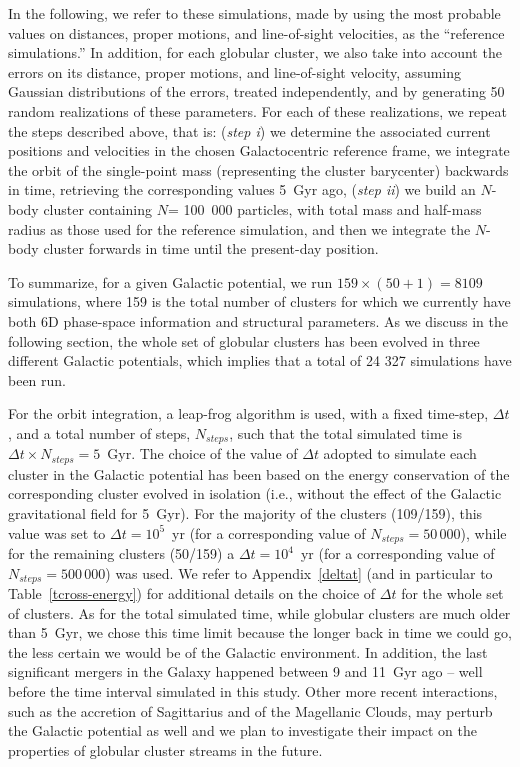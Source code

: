         In the following, we refer to these simulations, made by using the most probable values on distances, proper motions, and line-of-sight velocities, as the ``reference simulations.'' In addition, for each globular cluster, we also take into account the errors on its distance, proper motions, and line-of-sight velocity,  assuming Gaussian distributions of the errors, treated independently, and by generating 50 random realizations of these parameters.  For each of these realizations, we repeat the steps  described above, that is: (\textit{step i}) we determine the associated current positions and velocities in the chosen Galactocentric reference frame, we integrate the orbit of the single-point mass (representing the cluster barycenter) backwards in time, retrieving the corresponding values 5~Gyr ago, (\textit{step ii}) we build an $N$-body cluster containing $N$= 100~000 particles, with total mass and half-mass radius as those used for the reference simulation, and then we integrate the $N$-body cluster forwards in time until the present-day position. 

        To summarize, for a given Galactic potential, we run $159\times (50+1)=8109$ simulations, where 159 is the total number of clusters for which we currently have both 6D phase-space information and structural parameters. As we discuss in the following section, the whole set of globular clusters has been evolved in three different Galactic potentials, which implies that a total of 24 327 simulations have been run.

        For the orbit integration, a leap-frog algorithm is used, with a fixed time-step, $\Delta t$, and a total number of steps, $N_{steps}$, such that the total simulated time is  $\Delta t \times N_{steps}=5$~Gyr. The choice of the value of $\Delta t$ adopted to simulate each cluster in the Galactic potential has been based on the energy conservation of the corresponding cluster evolved in isolation (i.e., without the effect of the Galactic gravitational field for 5~Gyr). For the majority of the clusters (109/159), this value was set to $\Delta t = 10^5$~yr (for a corresponding value of $N_{steps}=50\,000$), while for the remaining clusters (50/159) a  $\Delta t = 10^4$~yr (for a corresponding value of $N_{steps}=500\,000$) was used. We refer to Appendix~\ref{deltat} (and in particular to Table~\ref{tcross-energy}) for additional details on the choice of $\Delta t$ for the whole set of clusters. As for the total simulated time, while globular clusters are much older than 5~Gyr, we chose this time limit because the longer back in time we could go, the less certain we would be of the Galactic environment. In addition, the last significant mergers in the Galaxy happened between 9 and 11~Gyr ago  \citep[see][]{2018MNRAS.478..611B, 2018Natur.563...85H, 2019A&A...632A...4D, 2019NatAs...3..932G, 2020MNRAS.498.2472K} -- well before the time interval simulated in this study. Other more recent interactions, such as the accretion of Sagittarius and of the Magellanic Clouds, may perturb the Galactic potential as well \citep[see, e.g.,][]{2021MNRAS.501.2279V} and we plan to investigate their impact on the properties of globular cluster streams in the future.


